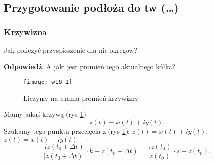 \documentclass[../main.tex]{subfiles}
\begin{document}
    \subsection{Przygotowanie podłoża do tw (\ldots)}
    \subsubsection{Krzywizna}
    \begin{pytanie}
        Jak policzyć przyspieszenie dla nie-okręgów?
    \end{pytanie}
    \textbf{Odpowiedź: }A jaki jest promień tego aktualnego kółka?
    \begin{figure}[h]
        \centering
        \texttt{[image: w18-1]}
        \caption{Liczymy na chama promień krzywizny}
        \label{fig:w18-1}
    \end{figure}
        Mamy jakąś krzywą (rys \ref{fig:w18-1})
        \[
            z(t) = x(t) + iy(t)
        .\]
    Szukamy tego punktu przecięcia z (rys \ref{fig:w18-1}): $\dot{z}(t) = \dot{x}(t) + i y(t)$, $z(t) = x(t) + iy(t)$
     \[
         \frac{i\dot{z}(t_0 + \Delta t)}{\left|z(t_0 + \Delta t)\right|} \cdot k + z(t_0 + \Delta t) = \frac{i\dot{z}(t_0)}{\left|\dot{z}(t_0)\right|}\cdot s + z(t_0)
    .\]
\end{document}
